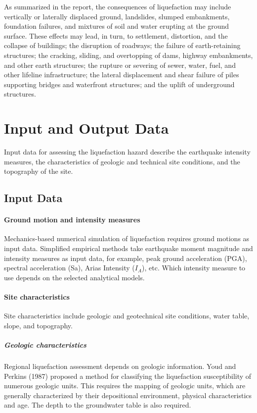 As summarized in the \cite{national2016state} report, the consequences of liquefaction may include vertically or laterally displaced ground, landslides, slumped embankments, foundation failures, and mixtures of soil and water erupting at the ground surface. These effects may lead, in turn, to settlement, distortion, and the collapse of buildings; the disruption of roadways; the failure of earth-retaining structures; the cracking, sliding, and overtopping of dams, highway embankments, and other earth structures; the rupture or severing of sewer, water, fuel, and other lifeline infrastructure; the lateral displacement and shear failure of piles supporting bridges and waterfront structures; and the uplift of underground structures.

\section{Input and Output Data}

Input data for assessing the liquefaction hazard describe the earthquake intensity measures, the characteristics of geologic and technical site conditions, and the topography of the site.

\subsection{Input Data}
\label{subsec:eq_liquefaction_input}

\paragraph{Ground motion and intensity measures}
Mechanics-based numerical simulation of liquefaction requires ground motions as input data. Simplified empirical methods take earthquake moment magnitude and intensity measures as input data, for example, peak ground acceleration (PGA), spectral acceleration (Sa), Arias Intensity ($I_A$), etc. Which intensity measure to use depends on the selected analytical models.


\paragraph{Site characteristics}
Site characteristics include geologic and geotechnical site conditions, water table, slope, and topography.

\subparagraph{Geologic characteristics}
Regional liquefaction assessment depends on geologic information.
Youd and Perkins (1987) proposed a method for classifying the liquefaction susceptibility of numerous geologic units. This requires the mapping of geologic units, which are generally characterized by their depositional environment, physical characteristics and age. The depth to the groundwater table is also required.


